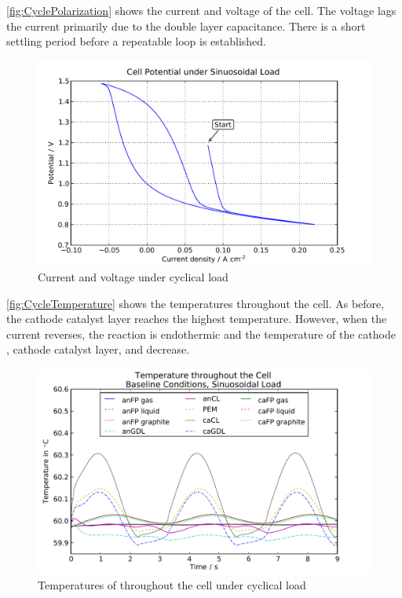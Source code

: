 \autoref{fig:CyclePolarization} shows the current and voltage of the cell.  The voltage lags the current primarily due to the double layer capacitance.  There is a short settling period before a repeatable loop is established.  

\begin{figure}[htbp]
  \includegraphics[width=\linewidth]{Results/Cell/Model/Cycle/Polarization}%
  \caption{Current and voltage under cyclical load}%
  \label{fig:CyclePolarization}
\end{figure}

\autoref{fig:CycleTemperature} shows the temperatures throughout the cell.  As before, the cathode catalyst layer reaches the highest temperature.  However, when the current reverses, the reaction is endothermic and the temperature of the cathode , cathode catalyst layer, and  decrease.  

\begin{figure}[htbp]
  \includegraphics[width=\linewidth]{Results/Cell/Model/Cycle/Temperature}%
  \caption{Temperatures of throughout the cell under cyclical load}%
  \label{fig:CycleTemperature}
\end{figure}

